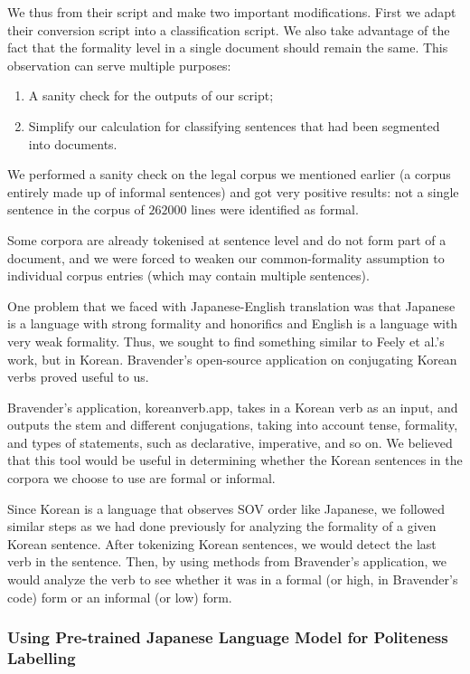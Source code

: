 \documentclass[11pt]{article}
\begin{document}
We thus from their script and make two important modifications. First we adapt their conversion script into a classification script. We also take advantage of the fact that the formality level in a single document should remain the same. This observation can serve multiple purposes:

\begin{enumerate}[label=\arabic*]
    \item A sanity check for the outputs of our script;
    \item Simplify our calculation for classifying sentences that had been segmented into documents.
\end{enumerate}

We performed a sanity check on the legal corpus we mentioned earlier (a corpus entirely made up of informal sentences) and got very positive results: not a single sentence in the corpus of $262000$ lines were identified as formal.

Some corpora are already tokenised at sentence level and do not form part of a document, and we were forced to weaken our common-formality assumption to individual corpus entries (which may contain multiple sentences). 

One problem that we faced with Japanese-English translation was that Japanese is a language with strong formality and honorifics and English is a language with very weak formality. Thus, we sought to find something similar to Feely et al.'s work, but in Korean. Bravender's open-source application on conjugating Korean verbs proved useful to us.

Bravender's application, koreanverb.app, takes in a Korean verb as an input, and outputs the stem and different conjugations, taking into account tense, formality, and types of statements, such as declarative, imperative, and so on. We believed that this tool would be useful in determining whether the Korean sentences in the corpora we choose to use are formal or informal.

Since Korean is a language that observes SOV order like Japanese, we followed similar steps as we had done previously for analyzing the formality of a given Korean sentence. After tokenizing Korean sentences, we would detect the last verb in the sentence. Then, by using methods from Bravender's application, we would analyze the verb to see whether it was in a formal (or high, in Bravender's code) form or an informal (or low) form.

\subsubsection{Using Pre-trained Japanese Language Model for Politeness Labelling}
\end{document}
